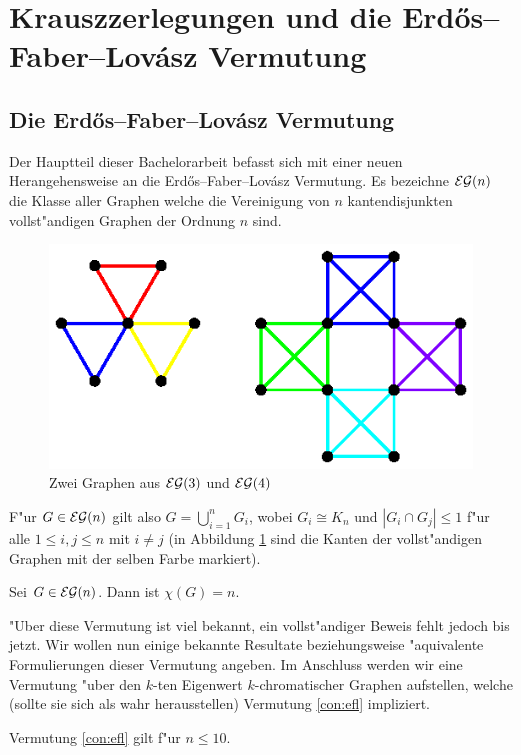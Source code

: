 \section{Krauszzerlegungen und die Erd\H{o}s--Faber--Lov\'asz Vermutung}
\subsection{Die Erd\H{o}s--Faber--Lov\'asz Vermutung}
\label{sec:EFL-Vermutung}
Der Hauptteil dieser Bachelorarbeit befasst sich mit einer neuen Herangehensweise an die Erd\H{o}s--Faber--Lov\'asz Vermutung. 
Es bezeichne ${\cal EG}(n)$ die Klasse aller Graphen welche die Vereinigung von $n$ kantendisjunkten vollst"andigen Graphen der Ordnung $n$ sind. 

\begin{figure}[htbp]
        \centering
        \includegraphics{images/bildeg3und4}
        \caption{Zwei Graphen aus ${\cal EG}(3)$ und ${\cal EG}(4)$}
        \label{fig:egraphen}
\end{figure}

F"ur $G\in{\cal EG}(n)$ gilt also $G= \bigcup\limits_{i=1}^{n} G_i$, wobei $G_i \cong K_n$ und $|G_i \cap G_j| \leq 1$ f"ur alle $1\leq i,j \leq n$ mit $i\neq j$ (in Abbildung \ref{fig:egraphen} sind die Kanten der vollst"andigen Graphen mit der selben Farbe markiert).
\begin{conjecture}
  Sei $G\in{\cal EG}(n)$. Dann ist $\chi(G) = n$.
  \label{con:efl}
\end{conjecture}
"Uber diese Vermutung ist viel bekannt, ein vollst"andiger Beweis fehlt jedoch bis jetzt. Wir wollen nun einige bekannte Resultate beziehungsweise "aquivalente Formulierungen dieser Vermutung angeben. Im Anschluss werden wir eine Vermutung "uber den $k$-ten Eigenwert $k$-chromatischer Graphen aufstellen, welche (sollte sie sich als wahr herausstellen) Vermutung \ref{con:efl} impliziert.
\begin{remark}
  Vermutung \ref{con:efl} gilt f"ur $n\leq 10$.
\end{remark}
